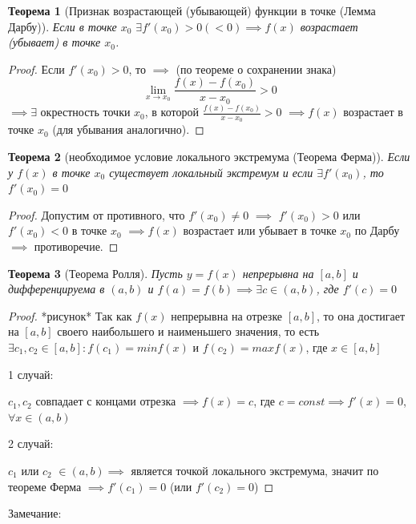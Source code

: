 \documentclass[a4paper,oneside]{article}
\newtheorem{theorem}{Теорема}[subsection]
\theoremstyle{definition}
\theoremstyle{definition}
\theoremstyle{definition}
\begin{document}
\begin{theorem}[Признак возрастающей (убывающей) функции в точке (Лемма Дарбу)]
        Если в точке $x_0$ $\exists f'(x_0)>0 (<0) \implies f(x)$ возрастает (убывает) в точке $x_0$.
\end{theorem}
\begin{proof}
        Если $f'(x_0)>0$, то $\implies$ (по теореме о сохранении знака)
        \[\lim_{x\to x_0} \frac{f(x)-f(x_0)}{x-x_0}>0\] 
        $\implies \exists$ окрестность точки $x_0$, в которой $\frac{f(x)-f(x_0)}{x-x_0}>0$ $\implies f(x)$ возрастает в точке $x_0$ (для убывания аналогично).
\end{proof}

\begin{theorem}[необходимое условие локального экстремума (Теорема Ферма)]
        Если у $f(x)$ в точке $x_0$ существует локальный экстремум и если $\exists f'(x_0)$, то $f'(x_0)=0$
\end{theorem}
\begin{proof}
        Допустим от противного, что $f'(x_0) \neq 0$ $\implies$ $f'(x_0)>0$ или $f'(x_0)<0$ в точке $x_0$ $\implies f(x)$ возрастает или убывает в точке $x_0$ по Дарбу $\implies$ противоречие.
\end{proof}
\begin{theorem}[Теорема Ролля]
        Пусть $y = f(x)$ непрерывна на $[a,b]$ и дифференцируема в $(a, b)$ и $f(a) = f(b) \implies \exists c \in (a, b)$, где $f'(c)=0$ 
\end{theorem}
\begin{proof}
        *рисунок*
        Так как $f(x)$ непрерывна на отрезке $[a, b]$, то она достигает на $[a, b]$ своего наибольшего и наименьшего значения, то есть $\exists c_1,c_2 \in [a, b]:f(c_1)=min f(x)$ и $f(c_2)=max f(x)$, где $x \in [a, b]$

        1 случай:

        $c_1, c_2$ совпадает с концами отрезка $\implies f(x) = c$, где $c = const \implies f'(x)=0$, $\forall x \in (a, b)$
        
        2 случай:

        $c_1$ или $c_2$ $\in (a, b) \implies$ является точкой локального экстремума, значит по теореме Ферма $\implies f'(c_1) = 0$ (или $f'(c_2) = 0$)   
\end{proof}

    Замечание:
\end{document}
